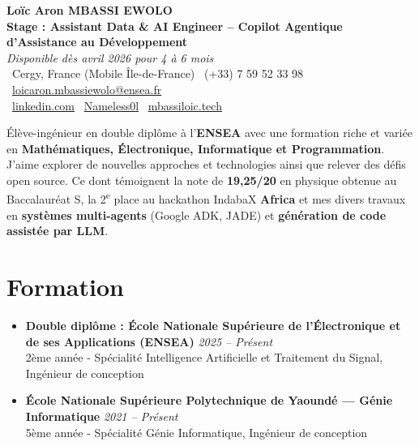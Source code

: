 \documentclass[a4paper,11pt]{article}
\begin{document}
\begin{center}
    {\large \textbf{Loïc Aron MBASSI EWOLO}} \\ \vspace{3pt}
    \textbf{\large Stage : Assistant Data \& AI Engineer – Copilot Agentique d'Assistance au Développement} \\
    \textit{\small Disponible dès avril 2026 pour 4 à 6 mois} \\ \vspace{3pt}
    \small
    \faMapMarker\ Cergy, France (Mobile Île-de-France) \quad
    \faPhone\ (+33) 7 59 52 33 98 \quad
    \faEnvelope\ \href{mailto:loicaron.mbassiewolo@ensea.fr}{loicaron.mbassiewolo@ensea.fr} \\ \vspace{2pt}
    \faLinkedin\ \href{https://www.linkedin.com/in/loic-aron-mbassi-ewolo-3942a9246/}{linkedin.com} \quad
    \faGithub\ \href{https://github.com/Nameless0l}{Nameless0l} \quad
    \faGlobe\ \href{https://mbassiloic.tech}{mbassiloic.tech}
\end{center}

\vspace{-5pt}

\noindent\small{Élève-ingénieur en double diplôme à l'\textbf{ENSEA} avec une formation riche et variée en \textbf{Mathématiques, Électronique, Informatique et Programmation}. 
J'aime explorer de nouvelles approches et technologies ainsi que relever des défis open source. 
Ce dont témoignent la note de \textbf{19,25/20} en physique obtenue au Baccalauréat S, la 2\textsuperscript{e} place au hackathon IndabaX \textbf{Africa} et mes divers travaux en \textbf{systèmes multi-agents} (Google ADK, JADE) et \textbf{génération de code assistée par LLM}.}

\vspace{.5pt}

\section{Formation}
\begin{itemize}[leftmargin=*, label={.}, nosep]
    \item \textbf{Double diplôme : École Nationale Supérieure de l'Électronique et de ses Applications (ENSEA)} \hfill \textit{2025 -- Présent} \\
    \small{2ème année - Spécialité Intelligence Artificielle et Traitement du Signal, Ingénieur de conception}
    \vspace{2pt}
    \item \textbf{École Nationale Supérieure Polytechnique de Yaoundé — Génie Informatique} \hfill \textit{2021 -- Présent} \\
    \small{5ème année - Spécialité Génie Informatique, Ingénieur de conception}
\end{itemize}
\end{document}
